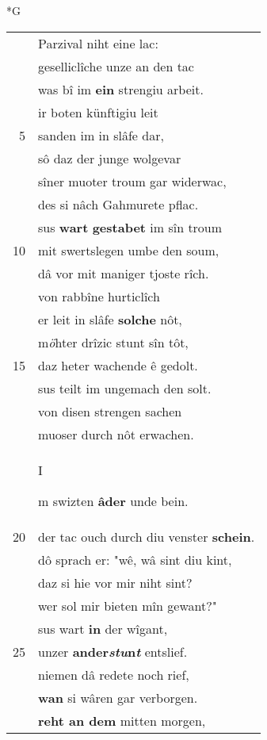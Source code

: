 \documentclass[8pt,a4paper,notitlepage]{article}
\begin{document}
\newpage
\begin{table}[ht]
\begin{minipage}[t]{0.5\linewidth}
\small
\begin{center}*G
\end{center}
\begin{tabular}{rl}
 & Parzival niht eine lac:\\ 
 & geselliclîche unze an den tac\\ 
 & was bî im \textbf{ein} strengiu arbeit.\\ 
 & ir boten künftigiu leit\\ 
5 & sanden im in slâfe dar,\\ 
 & sô daz der junge wolgevar\\ 
 & sîner muoter troum gar widerwac,\\ 
 & des si nâch Gahmurete pflac.\\ 
 & sus \textbf{wart} \textbf{gestabet} im sîn troum\\ 
10 & mit swertslegen umbe den soum,\\ 
 & dâ vor mit maniger tjoste rîch.\\ 
 & von rabbîne hurticlîch\\ 
 & er leit in slâfe \textbf{solche} nôt,\\ 
 & m\textit{ö}hter drîzic stunt sîn tôt,\\ 
15 & daz heter wachende ê gedolt.\\ 
 & sus teilt im ungemach den solt.\\ 
 & von disen strengen sachen\\ 
 & muoser durch nôt erwachen.\\ 
 & \begin{large}I\end{large}m swizten \textbf{âder} unde bein.\\ 
20 & der tac ouch durch diu venster \textbf{schein}.\\ 
 & dô sprach er: "wê, wâ sint diu kint,\\ 
 & daz si hie vor mir niht sint?\\ 
 & wer sol mir bieten mîn gewant?"\\ 
 & sus wart \textbf{in} der wîgant,\\ 
25 & unzer \textbf{ander\textit{stu}n\textit{t}} entslief.\\ 
 & niemen dâ redete noch rief,\\ 
 & \textbf{wan} si wâren gar verborgen.\\ 
 & \textbf{reht an dem} mitten morgen,\\ 

\end{tabular}
\end{minipage}
\end{table}
\end{document}
